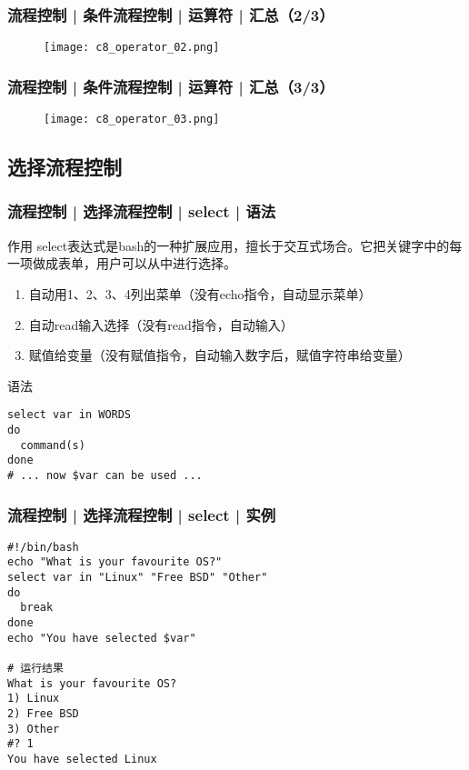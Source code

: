 \begin{frame}
  \frametitle{流程控制 | 条件流程控制 | 运算符 | 汇总（2/3）}
  \begin{figure}
    \centering
    \texttt{[image: c8\_operator\_02.png]}
  \end{figure}
\end{frame}

\begin{frame}
  \frametitle{流程控制 | 条件流程控制 | 运算符 | 汇总（3/3）}
  \begin{figure}
    \centering
    \texttt{[image: c8\_operator\_03.png]}
  \end{figure}
\end{frame}

\subsection{选择流程控制}
\begin{frame}[fragile]
  \frametitle{流程控制 | 选择流程控制 | select | \alert{语法}}
  \begin{block}{作用}
    select表达式是bash的一种扩展应用，擅长于交互式场合。它把关键字中的每一项做成表单，用户可以从中进行选择。
    \begin{enumerate}
      \item 自动用1、2、3、4列出菜单（没有echo指令，自动显示菜单）
      \item 自动read输入选择（没有read指令，自动输入）
      \item 赋值给变量（没有赋值指令，自动输入数字后，赋值字符串给变量）
    \end{enumerate}
  \end{block}
  \pause
  \begin{block}{语法}
\begin{lstlisting}
select var in WORDS
do
  command(s)
done
# ... now $var can be used ...
\end{lstlisting}
  \end{block}
\end{frame}

\begin{frame}[fragile]
  \frametitle{流程控制 | 选择流程控制 | select | \alert{实例}}
\begin{lstlisting}
#!/bin/bash
echo "What is your favourite OS?"
select var in "Linux" "Free BSD" "Other"
do
  break
done
echo "You have selected $var"

# 运行结果
What is your favourite OS?
1) Linux
2) Free BSD
3) Other
#? 1
You have selected Linux
\end{lstlisting}
\end{frame}

